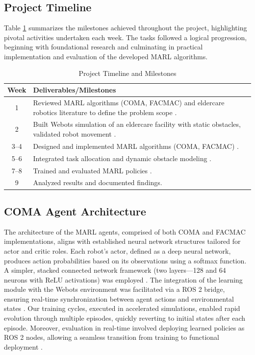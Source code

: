 \documentclass[conference]{IEEEtran}
\begin{document}
\subsection{Project Timeline}
Table \ref{tab:timeline} summarizes the milestones achieved throughout the project, highlighting pivotal activities undertaken each week. The tasks followed a logical progression, beginning with foundational research and culminating in practical implementation and evaluation of the developed MARL algorithms.

\begin{table}[h]
\caption{Project Timeline and Milestones}
\label{tab:timeline}
\begin{tabular}{|c|p{6cm}|}
\hline
\textbf{Week} & \textbf{Deliverables/Milestones} \\
\hline
1 & Reviewed MARL algorithms (COMA, FACMAC) and eldercare robotics literature to define the problem scope \citep{wang2023a, salinas2023}. \\
2 & Built Webots simulation of an eldercare facility with static obstacles, validated robot movement \citep{ztouni2021}. \\
3--4 & Designed and implemented MARL algorithms (COMA, FACMAC) \citep{wang2023a}. \\
5--6 & Integrated task allocation and dynamic obstacle modeling \citep{kayy2017, yang2022}. \\
7--8 & Trained and evaluated MARL policies \citep{salinas2023}. \\
9 & Analyzed results and documented findings. \\
\hline
\end{tabular}
\end{table}

\subsection{COMA Agent Architecture}
The architecture of the MARL agents, comprised of both COMA and FACMAC implementations, aligns with established neural network structures tailored for actor and critic roles. Each robot’s actor, defined as a deep neural network, produces action probabilities based on its observations using a softmax function. A simpler, stacked connected network framework (two layers—128 and 64 neurons with ReLU activations) was employed \citep{salinas2023}. The integration of the learning module with the Webots environment was facilitated via a ROS 2 bridge, ensuring real-time synchronization between agent actions and environmental states \citep{ztouni2021}. Our training cycles, executed in accelerated simulations, enabled rapid evolution through multiple episodes, quickly reverting to initial states after each episode. Moreover, evaluation in real-time involved deploying learned policies as ROS 2 nodes, allowing a seamless transition from training to functional deployment \citep{ztouni2021}.
\end{document}
